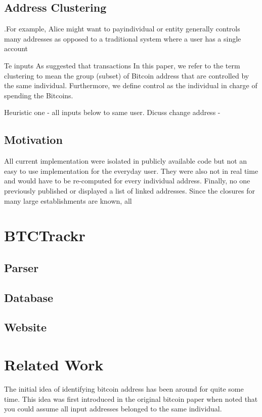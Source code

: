 \documentclass[10pt, letterpaper, twocolumn, twoside]{article}
\begin{document}
\subsection{Address Clustering}

.For example, Alice might want to payindividual or entity generally controls many addresses as opposed to a traditional system where a user has a single account

Te inputs As suggested that transactions In this paper, we refer to the term clustering to mean the group (subset) of Bitcoin address that are controlled by the same individual. Furthermore, we define control as the individual in charge of spending the Bitcoins.

Heuristic one - all inputs below to same user.
Dicuss change address - 

\subsection{Motivation}
All current implementation were isolated in publicly available code but not an easy to use implementation for the everyday user. They were also not in real time and would have to be re-computed for every individual address. Finally, no one previously published or displayed a list of linked addresses. Since the closures for many large establishments are known, all


\section{BTCTrackr}

\subsection{Parser}

\subsection{Database}

\subsection{Website}

\section{Related Work}
\label{related}
The initial idea of identifying bitcoin address has been around for quite some time. This idea was first introduced in the original bitcoin paper when noted that you could assume all input addresses belonged to the same individual.
\end{document}
